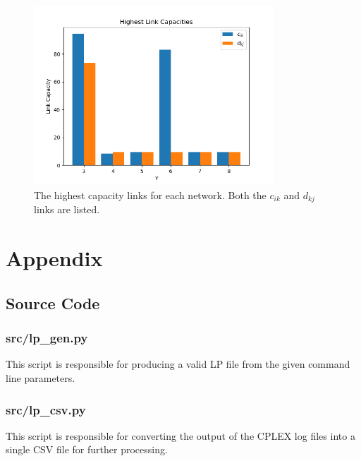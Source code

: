 \documentclass[12pt]{article} %
\begin{document}
\begin{figure}[H]
	\centering
	\includegraphics[width=0.8\textwidth]{cplex_data_highest_capacity_links}
	\caption{The highest capacity links for each network. Both the $c_{ik}$ and $d_{kj}$ links are listed.}
	\label{fig:cplex_highest_capacity_links}
\end{figure}


\section{Appendix}


\subsection{Source Code}
\label{section:source}

\subsubsection{src/lp\_gen.py}
This script is responsible for producing a valid LP file from the given command line parameters.


\subsubsection{src/lp\_csv.py}
This script is responsible for converting the output of the CPLEX log files into a single CSV file for further processing.

\end{document}
